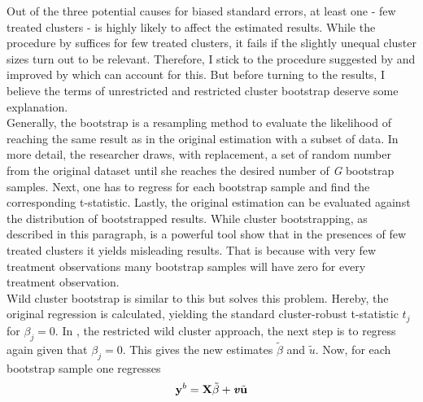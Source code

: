 \documentclass{article}
\begin{document}
Out of the three potential causes for biased standard errors, at least one - few treated clusters - is highly likely to affect the estimated results. While the procedure by \cite{conley2011inference} suffices for few treated clusters, it fails if the slightly unequal cluster sizes turn out to be relevant. Therefore, I stick to the procedure suggested by \cite{cameron2008bootstrap} and improved by \cite{mackinnon2018wild} which can account for this.
But before turning to the results, I believe the terms of unrestricted and restricted cluster bootstrap deserve some explanation. \\
Generally, the bootstrap is a resampling method to evaluate the likelihood of reaching the same result as in the original estimation with a subset of data. In more detail, the researcher draws, with replacement, a set of random number from the original dataset until she reaches the desired number of \textit{G} bootstrap samples. Next, one has to regress for each bootstrap sample and find the corresponding t-statistic. Lastly, the original estimation can be evaluated against the distribution of bootstrapped results. While cluster bootstrapping, as described in this paragraph, is a powerful tool \cite{mackinnon2017wild} show that in the presences of few treated clusters it yields misleading results. That is because with very few treatment observations many bootstrap samples will have zero for every treatment observation.\\
Wild cluster bootstrap is similar to this but solves this problem. Hereby, the original regression is calculated, yielding the standard cluster-robust t-statistic $ t_j $ for $\beta_j = 0$. In \cite{cameron2008bootstrap}, the restricted wild cluster approach, the next step is to regress again given that $\beta_j = 0$. This gives the new estimates $\tilde{\beta}$ and $\tilde{u}$. Now, for each bootstrap sample one regresses
\begin{align}
\textbf{y}^{b} = \textbf{X} \tilde{\beta} + \textbf{\textit{v}} \tilde{\textbf{u}}
\end{align}
\end{document}

